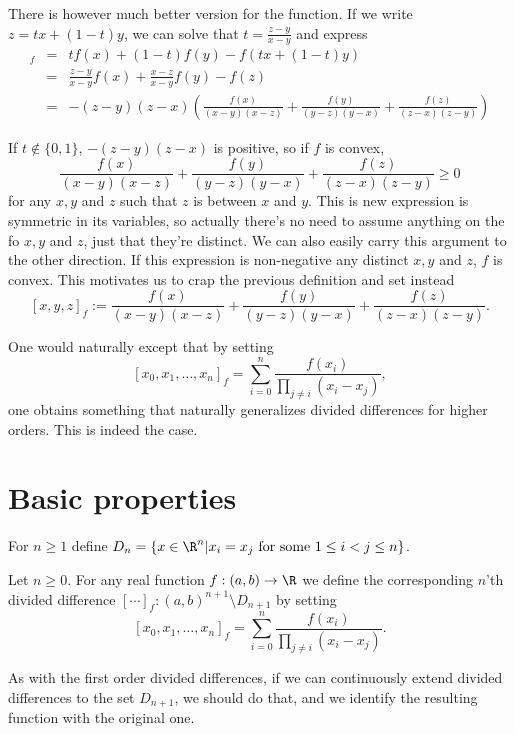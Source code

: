 There is however much better version for the function. If we write $z = t x + (1 - t) y$, we can solve that $t = \frac{z - y}{x - y}$ and express
\begin{eqnarray*}
	[x, y, t]_{f} &=& t f(x) + (1 - t) f(y) - f(t x + (1 - t)y) \\
	&=& \frac{z - y}{x - y} f(x) + \frac{x - z}{x - y} f(y) - f(z) \\
	&=& -(z - y)(z - x) \left(\frac{f(x)}{(x - y)(x - z)} + \frac{f(y)}{(y - z)(y - x)} + \frac{f(z)}{(z - x)(z - y)} \right)
\end{eqnarray*}

If $t \notin \{0, 1\}$, $-(z - y)(z - x)$ is positive, so if $f$ is convex,
\[
	\frac{f(x)}{(x - y)(x - z)} + \frac{f(y)}{(y - z)(y - x)} + \frac{f(z)}{(z - x)(z - y)} \geq 0
\]
for any $x, y$ and $z$ such that $z$ is between $x$ and $y$. This is new expression is symmetric in its variables, so actually there's no need to assume anything on the fo $x, y$ and $z$, just that they're distinct. We can also easily carry this argument to the other direction. If this expression is non-negative any distinct $x, y$ and $z$, $f$ is convex. This motivates us to crap the previous definition and set instead
\[
	[x, y, z]_{f} := \frac{f(x)}{(x - y)(x - z)} + \frac{f(y)}{(y - z)(y - x)} + \frac{f(z)}{(z - x)(z - y)}.
\]

One would naturally except that by setting
\[ 
	[x_{0}, x_{1}, \ldots, x_{n}]_{f} = \sum_{i = 0}^{n} \frac{f(x_{i})}{\prod_{j \neq i} (x_{i} - x_{j})},
\]
one obtains something that naturally generalizes divided differences for higher orders. This is indeed the case.

\section{Basic properties}

For $n \geq 1$ define $D_{n} = \{x\in \R^{n} | x_{i} = x_{j} \text{ for some $1 \leq i < j \leq n$}\}$.
\begin{maar}
Let $n \geq 0$. For any real function $f : (a, b) \to \R$ we define the corresponding $n$'th divided difference $[\cdots]_{f} : (a, b)^{n + 1} \setminus D_{n + 1}$ by setting
\[
	[x_{0}, x_{1}, \ldots, x_{n}]_{f} = \sum_{i = 0}^{n} \frac{f(x_{i})}{\prod_{j \neq i} (x_{i} - x_{j})}.
\]
\end{maar}

As with the first order divided differences, if we can continuously extend divided differences to the set $D_{n + 1}$, we should do that, and we identify the resulting function with the original one.

